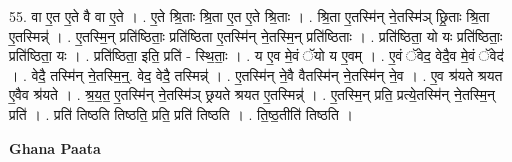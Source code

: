 \documentclass[17pt]{extarticle}
\begin{document}
55. वा ए॒त ए॒ते वै वा ए॒ते । . ए॒ते श्रि॒ताः श्रि॒ता ए॒त ए॒ते श्रि॒ताः । . श्रि॒ता ए॒तस्मि॑न् ने॒तस्मि॑ञ् छ्रि॒ताः श्रि॒ता ए॒तस्मिन्न्॑ । . ए॒तस्मि॒न् प्रति॑ष्ठिताः॒ प्रति॑ष्ठिता ए॒तस्मि॑न् ने॒तस्मि॒न् प्रति॑ष्ठिताः । . प्रति॑ष्ठिता॒ यो यः प्रति॑ष्ठिताः॒ प्रति॑ष्ठिता॒ यः । . प्रति॑ष्ठिता॒ इति॒ प्रति॑ - स्थि॒ताः॒ । . य ए॒व मे॒वं ॅयो य ए॒वम् । . ए॒वं ॅवेद॒ वेदै॒व मे॒वं ॅवेद॑ । . वेदै॒ तस्मि॑न् ने॒तस्मि॒न्॒. वेद॒ वेदै॒ तस्मिन्न्॑ । . ए॒तस्मि॑न् ने॒वै वैतस्मि॑न् ने॒तस्मि॑न् ने॒व । . ए॒व श्र॑यते श्रयत ए॒वैव श्र॑यते । . श्र॒य॒त॒ ए॒तस्मि॑न् ने॒तस्मि॑ञ् छ्रयते श्रयत ए॒तस्मिन्न्॑ । . ए॒तस्मि॒न् प्रति॒ प्रत्ये॒तस्मि॑न् ने॒तस्मि॒न् प्रति॑ । . प्रति॑ तिष्ठति तिष्ठति॒ प्रति॒ प्रति॑ तिष्ठति । . ति॒ष्ठ॒तीति॑ तिष्ठति । \newline

\textbf{Ghana Paata } \newline
\end{document}
